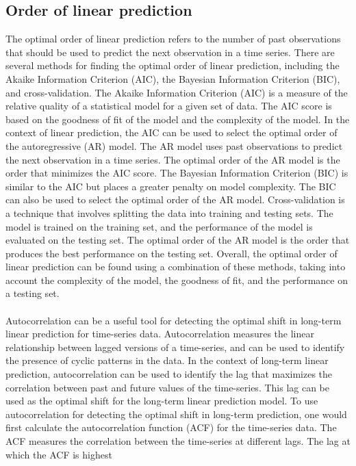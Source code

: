    \subsection{Order of linear prediction} \label{subsec:orderlp}
    The optimal order of linear prediction refers to the number of past observations that should be used to predict the next observation in a time series.
    There are several methods for finding the optimal order of linear prediction, including the Akaike Information Criterion (AIC), the Bayesian Information
    Criterion (BIC), and cross-validation. The Akaike Information Criterion (AIC) is a measure of the relative quality of a statistical model for a given 
    set of data. The AIC score is based on the goodness of fit of the model and the complexity of the model. In the context of linear prediction, the AIC
    can be used to select the optimal order of the autoregressive (AR) model. The AR model uses past observations to predict the next observation in a time
    series. The optimal order of the AR model is the order that minimizes the AIC score.
    The Bayesian Information Criterion (BIC) is similar to the AIC but places a greater penalty on model complexity. The BIC can also be used to select the
    optimal order of the AR model. Cross-validation is a technique that involves splitting the data into training and testing sets. The model is trained
    on the training set, and the performance of the model is evaluated on the testing set. The optimal order of the AR model is the order that produces
    the best performance on the testing set. Overall, the optimal order of linear prediction can be found using a combination of these methods,
    taking into account the complexity of the model, the goodness of fit, and the performance on a testing set.\\
    \\
    Autocorrelation can be a useful tool for detecting the optimal shift in long-term linear prediction for time-series data. Autocorrelation measures the
    linear relationship between lagged versions of a time-series, and can be used to identify the presence of cyclic patterns in the data.
    In the context of long-term linear prediction, autocorrelation can be used to identify the lag that maximizes the correlation between past and future
    values of the time-series. This lag can be used as the optimal shift for the long-term linear prediction model.
    To use autocorrelation for detecting the optimal shift in long-term prediction, one would first calculate the autocorrelation
    function (ACF) for the time-series data. The ACF measures the correlation between the time-series at different lags. The lag at which the ACF is highest
